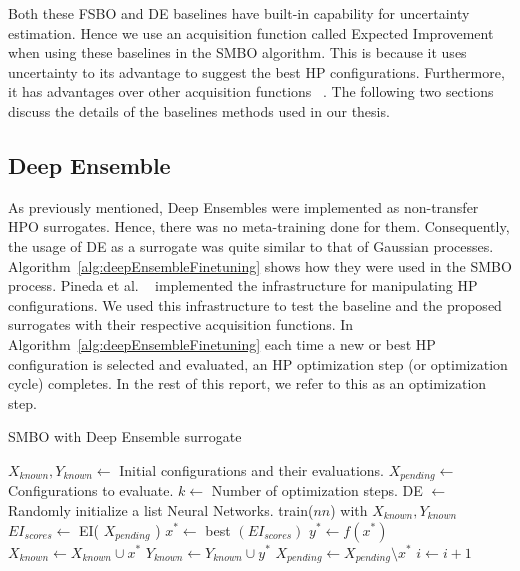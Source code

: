\documentclass[12pt, twoside, ngerman]{report}
\begin{document}
Both these FSBO and DE baselines have built-in capability for uncertainty estimation.
Hence we use an acquisition function called Expected Improvement when using these baselines in the SMBO algorithm.
This is because it uses uncertainty to its advantage to suggest the best HP configurations.
Furthermore, it has advantages over other acquisition functions ~\cite{Jones1998}.
The following two sections discuss the details of the baselines methods used in our thesis.

\subsection{Deep Ensemble}

As previously mentioned, Deep Ensembles were implemented as non-transfer HPO surrogates.
Hence, there was no meta-training done for them.
Consequently, the usage of DE as a surrogate was quite similar to that of Gaussian processes.
Algorithm~\ref{alg:deepEnsembleFinetuning} shows how they were used in the SMBO process. Pineda et al. ~\cite{pineda2021hpob} implemented the infrastructure for manipulating HP configurations. We used this infrastructure to test the baseline and the proposed surrogates with their respective acquisition functions.
In Algorithm~\ref{alg:deepEnsembleFinetuning}  each time a new or best HP configuration is selected and evaluated,  an HP optimization step (or optimization cycle) completes.
In the rest of this report,  we refer to this as an optimization step.

\begin{algorithm}[htb]
\caption{SMBO with Deep Ensemble surrogate}
\label{alg:deepEnsembleFinetuning}
\begin{algorithmic}
    \State $X_{known},  Y_{known} \gets$ Initial configurations and their evaluations.
    \State $X_{pending} \gets$ Configurations to evaluate.
    \State $k \gets$ Number of optimization steps.
        \State DE $\gets$ Randomly initialize a list Neural Networks. 
          
            \State train($nn$) with $X_{known},  Y_{known}$
        \EndFor
        \State $EI_{scores} \gets$ EI( $X_{pending}$ ) 
        \State $x^* \gets $ best $(EI_{scores})$
        \State $y^* \gets f(x^*)$ 
        \State $X_{known} \gets X_{known} \cup x^*$
        \State $Y_{known} \gets Y_{known} \cup y^*$
        \State $X_{pending} \gets X_{pending} \setminus x^*$ 
        \State $i \gets i + 1$
    \EndFor
    
\end{algorithmic}
\end{algorithm}
\end{document}
